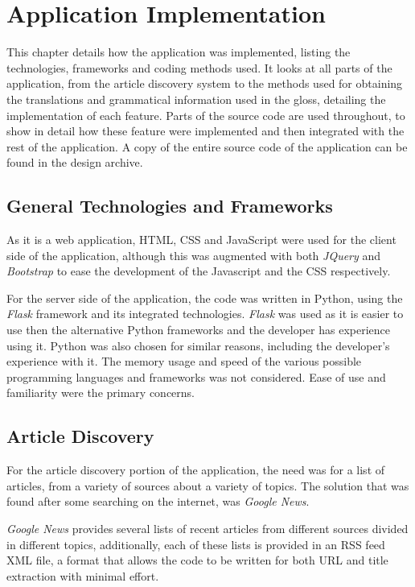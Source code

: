 
\chapter{Application Implementation}

This chapter details how the application was implemented, listing the technologies, frameworks and coding methods used. It looks at all parts of the application, from the article discovery system to the methods used for obtaining the translations and grammatical information used in the gloss, detailing the implementation of each feature. Parts of the source code are used throughout, to show in detail how these feature were implemented and then integrated with the rest of the application. A copy of the entire source code of the application can be found in the design archive.

\section{General Technologies and Frameworks}

As it is a web application, HTML, CSS and JavaScript were used for the client side of the application, although this was augmented with both \textit{JQuery} and \textit{Bootstrap} to ease the development of the Javascript and the CSS respectively. 

For the server side of the application, the code was written in Python, using the \textit{Flask} framework and its integrated technologies. \textit{Flask} was used as it is easier to use then the alternative Python frameworks and the developer has experience using it. Python was also chosen for similar reasons, including the developer's experience with it. The memory usage and speed of the various possible programming languages and frameworks was not considered. Ease of use and familiarity were the primary concerns. 

\section{Article Discovery}

For the article discovery portion of the application, the need was for a list of articles, from a variety of sources about a variety of topics. The solution that was found after some searching on the internet, was \textit{Google News}.

\textit{Google News} provides several lists of recent articles from different sources divided in different topics, additionally, each of these lists is provided in an RSS feed XML file, a format that allows the code to be written for both URL and title extraction with minimal effort.


